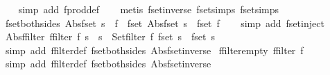 \begin{isabellebody}
%
\isadelimproof
\ \ %
\endisadelimproof
%
\isatagproof
{}\isamarkupfalse%
\ {\isacharparenleft}simp\ add{\isacharcolon}\ fprod{\isacharunderscore}def{\isacharparenright}\isanewline
\ \ \isamarkupfalse%
\ {\isacharparenleft}metis\ fset{\isacharunderscore}inverse\ fset{\isacharunderscore}simps{\isacharparenleft}{}{\isacharparenright}\ fset{\isacharunderscore}simps{\isacharparenleft}{}{\isacharparenright}{\isacharparenright}%
\endisatagproof
{\isafoldproof}%
%
\isadelimproof
\isanewline
%
\endisadelimproof
\isanewline
{}\isamarkupfalse%
\ fset{\isacharunderscore}both{\isacharunderscore}sides{\isacharcolon}\ {\isachardoublequoteopen}{\isacharparenleft}Abs{\isacharunderscore}fset\ s\ {\isacharequal}\ f{\isacharparenright}\ {\isacharequal}\ {\isacharparenleft}fset\ {\isacharparenleft}Abs{\isacharunderscore}fset\ s{\isacharparenright}\ {\isacharequal}\ fset\ f{\isacharparenright}{\isachardoublequoteclose}\isanewline
%
\isadelimproof
\ \ %
\endisadelimproof
%
\isatagproof
{}\isamarkupfalse%
\ {\isacharparenleft}simp\ add{\isacharcolon}\ fset{\isacharunderscore}inject{\isacharparenright}%
\endisatagproof
{\isafoldproof}%
%
\isadelimproof
\isanewline
%
\endisadelimproof
\isanewline
{}\isamarkupfalse%
\ Abs{\isacharunderscore}ffilter{\isacharcolon}\ {\isachardoublequoteopen}{\isacharparenleft}ffilter\ f\ s\ {\isacharequal}\ s{\isacharprime}{\isacharparenright}\ {\isacharequal}\ {\isacharparenleft}Set{\isachardot}filter\ f\ {\isacharparenleft}fset\ s{\isacharparenright}\ {\isacharequal}\ {\isacharparenleft}fset\ s{\isacharprime}{\isacharparenright}{\isacharparenright}{\isachardoublequoteclose}\isanewline
%
\isadelimproof
\ \ %
\endisadelimproof
%
\isatagproof
{}\isamarkupfalse%
\ {\isacharparenleft}simp\ add{\isacharcolon}\ ffilter{\isacharunderscore}def\ fset{\isacharunderscore}both{\isacharunderscore}sides\ Abs{\isacharunderscore}fset{\isacharunderscore}inverse{\isacharparenright}%
\endisatagproof
{\isafoldproof}%
%
\isadelimproof
\isanewline
%
\endisadelimproof
\isanewline
{}\isamarkupfalse%
\ ffilter{\isacharunderscore}empty{\isacharcolon}\ {\isachardoublequoteopen}ffilter\ f\ {\isacharbraceleft}{\isacharbar}{\isacharbar}{\isacharbraceright}\ {\isacharequal}\ {\isacharbraceleft}{\isacharbar}{\isacharbar}{\isacharbraceright}{\isachardoublequoteclose}\isanewline
%
\isadelimproof
\ \ %
\endisadelimproof
%
\isatagproof
{}\isamarkupfalse%
\ {\isacharparenleft}simp\ add{\isacharcolon}\ ffilter{\isacharunderscore}def\ fset{\isacharunderscore}both{\isacharunderscore}sides\ Abs{\isacharunderscore}fset{\isacharunderscore}inverse{\isacharparenright}\isanewline

\end{isabellebody}
